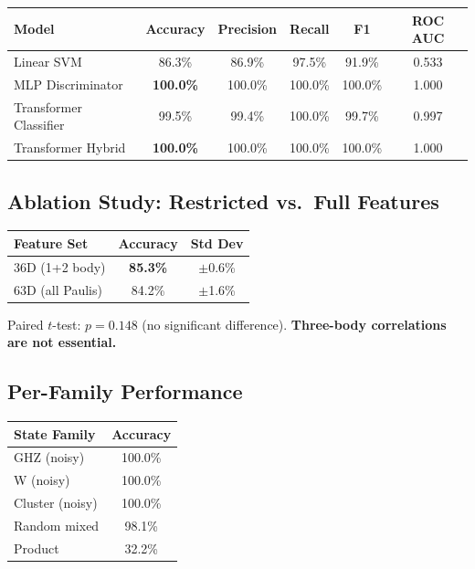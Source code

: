\documentclass[11pt,a4paper]{article}
\begin{document}
\begin{center}
\begin{tabular}{lccccc}
\toprule
\textbf{Model} & \textbf{Accuracy} & \textbf{Precision} & \textbf{Recall} & \textbf{F1} & \textbf{ROC AUC} \\
\midrule
Linear SVM & 86.3\% & 86.9\% & 97.5\% & 91.9\% & 0.533 \\
MLP Discriminator & \textbf{100.0\%} & 100.0\% & 100.0\% & 100.0\% & 1.000 \\
Transformer Classifier & 99.5\% & 99.4\% & 100.0\% & 99.7\% & 0.997 \\
Transformer Hybrid & \textbf{100.0\%} & 100.0\% & 100.0\% & 100.0\% & 1.000 \\
\bottomrule
\end{tabular}
\end{center}

\subsection{Ablation Study: Restricted vs.\ Full Features}

\begin{center}
\begin{tabular}{lcc}
\toprule
\textbf{Feature Set} & \textbf{Accuracy} & \textbf{Std Dev} \\
\midrule
36D (1+2 body) & \textbf{85.3\%} & $\pm$0.6\% \\
63D (all Paulis) & 84.2\% & $\pm$1.6\% \\
\bottomrule
\end{tabular}
\end{center}

Paired $t$-test: $p = 0.148$ (no significant difference). \textbf{Three-body correlations are not essential.}

\subsection{Per-Family Performance}

\begin{center}
\begin{tabular}{lc}
\toprule
\textbf{State Family} & \textbf{Accuracy} \\
\midrule
GHZ (noisy) & 100.0\% \\
W (noisy) & 100.0\% \\
Cluster (noisy) & 100.0\% \\
Random mixed & 98.1\% \\
Product & 32.2\% \\
\bottomrule
\end{tabular}
\end{center}
\end{document}
